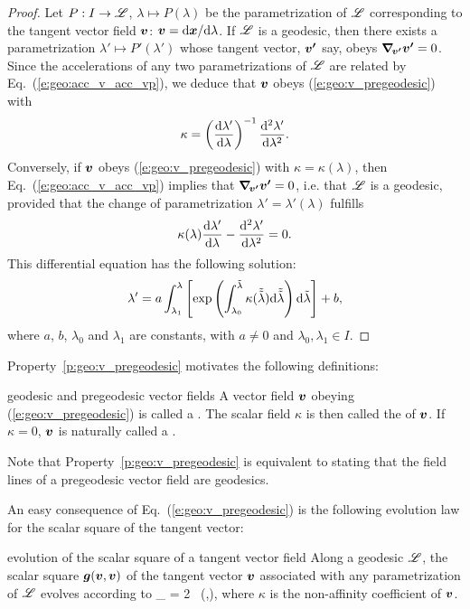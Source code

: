 \begin{proof}
Let $P: I\to \mathscr{L}$, $\lambda\mapsto P(\lambda)$ be the parametrization of $\mathscr{L}$
corresponding to the tangent vector field $\bm{v}$: $\bm{v} = \mathrm{d}\bm{x}/\mathrm{d}\lambda$.
If $\mathscr{L}$ is a geodesic, then there exists a parametrization
$\lambda'\mapsto P'(\lambda')$ whose tangent vector, $\bm{v'}$ say, obeys
$\bm{\nabla}_{\!\bm{v'}}\bm{v'} = 0$. Since the accelerations of any two parametrizations of $\mathscr{L}$
are related by Eq.~(\ref{e:geo:acc_v_acc_vp}), we deduce that $\bm{v}$ obeys
(\ref{e:geo:v_pregeodesic}) with
\[
    \kappa = \left( \frac{\mathrm{d}\lambda'}{\mathrm{d}\lambda} \right)^{-1}
        \frac{\mathrm{d}^2\lambda'}{\mathrm{d}\lambda^2} .
\]
Conversely, if $\bm{v}$ obeys (\ref{e:geo:v_pregeodesic}) with $\kappa=\kappa(\lambda)$,
then Eq.~(\ref{e:geo:acc_v_acc_vp}) implies that $\bm{\nabla}_{\!\bm{v'}}\bm{v'} = 0$,
i.e. that $\mathscr{L}$ is a geodesic, provided that the change of
parametrization $\lambda' = \lambda'(\lambda)$ fulfills
\[
    \kappa(\lambda) \frac{\mathrm{d}\lambda'}{\mathrm{d}\lambda} -  \frac{\mathrm{d}^2\lambda'}{\mathrm{d}\lambda^2} = 0 .
\]
This differential equation has the following solution:
\[
    \lambda' = a \int_{\lambda_1}^\lambda \left[ \exp \left(
    \int_{\lambda_0}^{\tilde{\lambda}} \kappa(\tilde{\tilde{\lambda}})
    \mathrm{d}\tilde{\tilde{\lambda}}\right) \mathrm{d}\tilde\lambda
    \right] + b,
\]
where $a$, $b$, $\lambda_0$ and $\lambda_1$ are constants, with $a\not = 0$ and $\lambda_0,\lambda_1\in I$.
\end{proof}
Property~\ref{p:geo:v_pregeodesic} motivates the following definitions:
\begin{tdef}{geodesic and pregeodesic vector fields}{}
A vector field $\bm{v}$ obeying (\ref{e:geo:v_pregeodesic}) is called
a .
The scalar field $\kappa$ is then called the  of $\bm{v}$.
If $\kappa=0$, $\bm{v}$ is naturally called a .
\end{tdef}
Note that Property~\ref{p:geo:v_pregeodesic} is equivalent to stating that the
field lines of a pregeodesic vector field are geodesics.

An easy consequence of Eq.~(\ref{e:geo:v_pregeodesic}) is the following
evolution law for the scalar square of the tangent vector:
\begin{tprop}{evolution of the scalar square of a tangent vector field}{}
Along a geodesic $\mathscr{L}$, the scalar square $\bm{g}(\bm{v},\bm{v})$
of the tangent vector $\bm{v}$ associated with any parametrization of $\mathscr{L}$
evolves according to
\be \label{e:geo:evol_vv_kappa}
    \wnab_{\!} \left[ \w{g}(\w{v},\w{v}) \right] = 2 \kappa \, (,),
\ee
where $\kappa$ is the non-affinity coefficient of $\bm{v}$.
\end{tprop}

